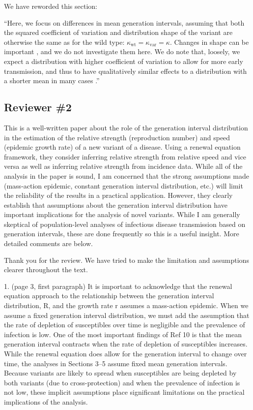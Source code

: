 \documentclass[12pt]{article}
\newcommand{\rev}{\subsection*}
\newcommand{\revtext}{\textsf}
\begin{document}
We have reworded this section:

``Here, we focus on differences in mean generation intervals, assuming that both the squared coefficient of variation and distribution shape of the variant are otherwise the same as for the wild type: $\kappa_{\mathrm{wt}} = \kappa_{\mathrm{var}} = \kappa$.
Changes in shape can be important \citep{miller2010epidemics,svensson2015influence}, and we do not investigate them here. 
We do note that, loosely, we expect a distribution with higher coefficient of variation to allow for more early transmission, and thus to have qualitatively similar effects to a distribution with a shorter mean in many cases \citep{park2019practical}.''

\rev{Reviewer \#2}

\revtext{This is a well-written paper about the role of the generation interval distribution in the estimation of the relative strength (reproduction number) and speed
(epidemic growth rate) of a new variant of a disease. Using a renewal equation
framework, they consider inferring relative strength from relative speed and vice
versa as well as inferring relative strength from incidence data. While all of the
analysis in the paper is sound, I am concerned that the strong assumptions made
(mass-action epidemic, constant generation interval distribution, etc.) will limit
the reliability of the results in a practical application. However, they clearly
establish that assumptions about the generation interval distribution have important implications for the analysis of novel variants. While I am generally
skeptical of population-level analyses of infectious disease transmission based
on generation intervals, these are done frequently so this is a useful insight.
More detailed comments are below.}

Thank you for the review. 
We have tried to make the limitation and assumptions clearer throughout the text.

\revtext{1. (page 3, first paragraph) It is important to acknowledge that the renewal equation approach to the relationship between the generation interval
distribution, R, and the growth rate r assumes a mass-action epidemic.
When we assume a fixed generation interval distribution, we must add the
assumption that the rate of depletion of susceptibles over time is negligible and the prevalence of infection is low. One of the most important
findings of Ref 10 is that the mean generation interval contracts when the
rate of depletion of susceptibles increases. While the renewal equation
does allow for the generation interval to change over time, the analyses
in Sections 3–5 assume fixed mean generation intervals. Because variants
are likely to spread when susceptibles are being depleted by both variants
(due to cross-protection) and when the prevalence of infection is not low, these implicit assumptions place significant limitations on the practical
implications of the analysis.}
\end{document}
